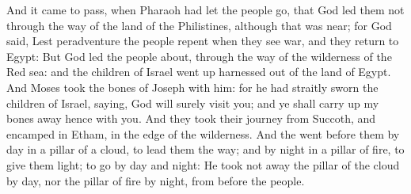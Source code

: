 \begin{biblechapter}
 And it came to pass, when Pharaoh had let the people go, that God led them not through the way of the land of the Philistines, although that was near; for God said, Lest peradventure the people repent when they see war, and they return to Egypt:
\verse But God led the people about, through the way of the wilderness of the Red sea: and the children of Israel went up harnessed out of the land of Egypt.
\verse And Moses took the bones of Joseph with him: for he had straitly sworn the children of Israel, saying, God will surely visit you; and ye shall carry up my bones away hence with you.
\verse And they took their journey from Succoth, and encamped in Etham, in the edge of the wilderness.
\verse And the \LORD went before them by day in a pillar of a cloud, to lead them the way; and by night in a pillar of fire, to give them light; to go by day and night:
\verse He took not away the pillar of the cloud by day, nor the pillar of fire by night, from before the people.
\end{biblechapter}

